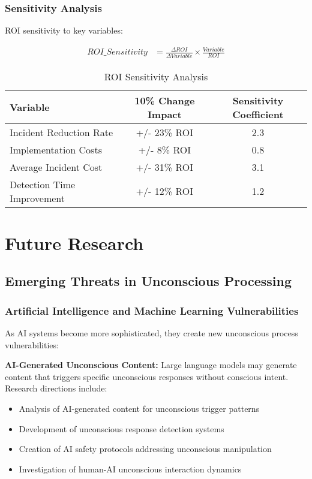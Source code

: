 \documentclass[11pt,a4paper]{article}
\begin{document}
\subsubsection{Sensitivity Analysis}

ROI sensitivity to key variables:

\begin{align}
ROI\_Sensitivity &= \frac{\Delta ROI}{\Delta Variable} \times \frac{Variable}{ROI}
\end{align}

\begin{table}[H]
\centering
\caption{ROI Sensitivity Analysis}
\begin{tabular}{lcc}
\toprule
Variable & 10\% Change Impact & Sensitivity Coefficient \\
\midrule
Incident Reduction Rate & +/- 23\% ROI & 2.3 \\
Implementation Costs & +/- 8\% ROI & 0.8 \\
Average Incident Cost & +/- 31\% ROI & 3.1 \\
Detection Time Improvement & +/- 12\% ROI & 1.2 \\
\bottomrule
\end{tabular}
\end{table}

\section{Future Research}

\subsection{Emerging Threats in Unconscious Processing}

\subsubsection{Artificial Intelligence and Machine Learning Vulnerabilities}

As AI systems become more sophisticated, they create new unconscious process vulnerabilities:

\textbf{AI-Generated Unconscious Content:}
Large language models may generate content that triggers specific unconscious responses without conscious intent. Research directions include:
\begin{itemize}
\item Analysis of AI-generated content for unconscious trigger patterns
\item Development of unconscious response detection systems
\item Creation of AI safety protocols addressing unconscious manipulation
\item Investigation of human-AI unconscious interaction dynamics
\end{itemize}
\end{document}
